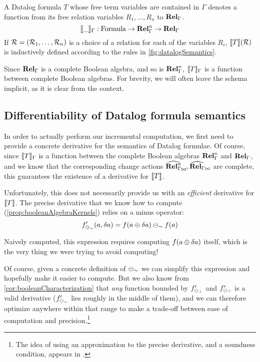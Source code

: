 \begin{defn}
  A Datalog formula $T$ whose free term variables are contained in $\Gamma$ denotes a function from 
  its free relation variables $R_1, \ldots, R_n$ 
  to $\mathbf{Rel}_\Gamma$.
  \begin{displaymath}
    \llbracket \_ \rrbracket_\Gamma : \mathrm{Formula} \rightarrow \mathbf{Rel}_\Gamma^n \rightarrow \mathbf{Rel}_\Gamma
  \end{displaymath}
  If $\mathcal{R} = (\mathcal{R}_1, \ldots, \mathcal{R}_n)$ is a choice of a relation for each of the variables $R_i$,
  $\llbracket T \rrbracket(\mathcal{R})$ is inductively defined according to the rules in \cref{fig:datalogSemantics}.
\end{defn}

Since $\mathbf{Rel}_\Gamma$ is a complete Boolean algebra, and so is $\mathbf{Rel}_\Gamma^n$, $\llbracket T \rrbracket_\Gamma$ is
a function between complete Boolean algebras. For brevity, we will often leave the schema implicit,
as it is clear from the context.

\subsection{Differentiability of Datalog formula semantics}
\label{sec:datalogDifferentiability}

In order to actually perform our incremental computation, we first need to provide a concrete derivative for the semantics
of Datalog formulae. Of course, since $\llbracket T \rrbracket_\Gamma$ is a function between the complete Boolean algebras 
$\mathbf{Rel}_\Gamma^n$ and
$\mathbf{Rel}_\Gamma$, and we know that the corresponding change actions 
$\widehat{\mathbf{Rel}_\Gamma^n}_{\bowtie}, \widehat{\mathbf{Rel}_\Gamma}_{\bowtie}$
are complete, this guarantees the existence of a derivative for $\llbracket T \rrbracket$.

Unfortunately, this does not necessarily provide us with an \emph{efficient} 
derivative for $\llbracket T \rrbracket$. The precise derivative that we know how to compute
(\cref{prop:booleanAlgebraKernels}) relies on
a minus operator:
\begin{displaymath}
  f'_{\ominus_\sim}(a, \delta a) = f(a \oplus \delta a) \ominus_\sim f(a)
\end{displaymath}

Naively computed, this expression requires computing $f(a \oplus \delta a)$
itself, which is the very thing we were trying to avoid computing!

Of course, given a concrete definition of $\ominus_\sim$ we can simplify this
expression and hopefully make it easier to compute. But we also know from
\cref{cor:booleanCharacterization} that \emph{any} function bounded by
$f'_{\ominus_\bot}$ and $f'_{\ominus_\top}$ is a valid
derivative ($f'_{\ominus_\sim}$ lies roughly in the middle of them),
and we can therefore optimize anywhere within that range to make a 
trade-off between ease of computation and precision.\footnote{The idea of using an approximation
to the precise derivative, and a soundness condition, appears in \textcite{bancilhon1986amateur}.}

